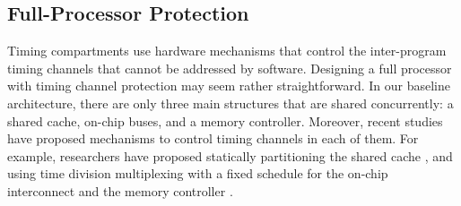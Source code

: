 %

\subsection{Full-Processor Protection}

Timing compartments use hardware mechanisms that control the inter-program 
timing channels that cannot be addressed by software.
Designing a full processor with timing channel
protection may seem rather straightforward. In our baseline architecture, there 
are only three main structures that are shared concurrently: a shared cache, 
on-chip buses, and a memory controller. Moreover, recent studies have proposed 
mechanisms to control timing channels in each of them. For example, researchers have 
proposed statically partitioning the shared cache \cite{percival}, and using time 
division multiplexing with a fixed schedule for the on-chip interconnect 
\cite{yaonocs, surfnoc} and the memory controller \cite{ushpca14}.

